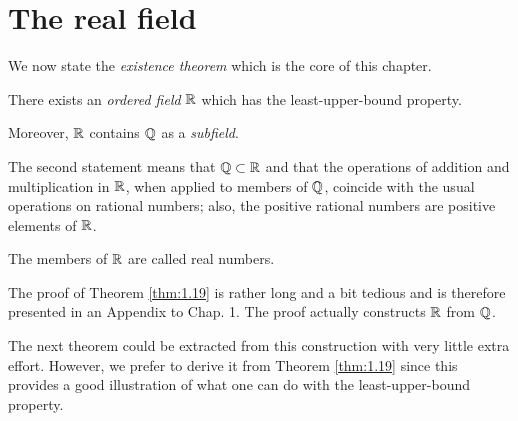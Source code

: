 
\section{The real field}

We now state the \emph{existence theorem} which is the core of this chapter.

\begin{thm}\label{thm:1.19}
    There exists an \emph{ordered field} ${\protect\mathbb R}$ 
    which has the least-upper-bound property.

    Moreover, ${\protect\mathbb R}$ contains ${\protect\mathbb Q} $ as a \emph{subfield}.
\end{thm}

The second statement means that ${\protect\mathbb Q} \subset {\protect\mathbb R}$ 
and that the operations of addition and multiplication in ${\protect\mathbb R}$, 
when applied to members of ${\protect\mathbb Q} $, 
coincide with the usual operations on rational numbers; 
also, the positive rational numbers are positive elements of ${\protect\mathbb R}$.

The members of ${\protect\mathbb R}$ are called real numbers.

The proof of Theorem \ref{thm:1.19} is rather long and a bit tedious 
and is therefore presented in an Appendix to Chap. 1. The proof actually constructs ${\protect\mathbb R}$ from ${\protect\mathbb Q}$.

The next theorem could be extracted from this construction with very
little extra effort. 
However, we prefer to derive it from Theorem \ref{thm:1.19} since this
provides a good illustration of what one can do with the least-upper-bound property.



